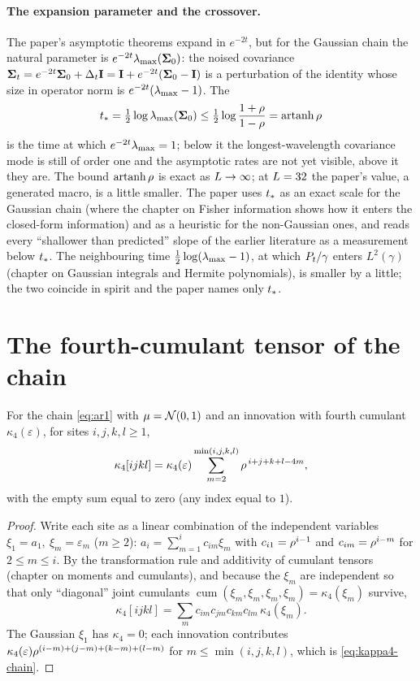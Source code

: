 \paragraph{The expansion parameter and the crossover.}
The paper's asymptotic theorems expand in $e^{-2t}$, but for the Gaussian chain the
natural parameter is $e^{-2t}\lambda_{\max}(\mathbf{\Sigma}_0)$: the noised covariance
$\mathbf{\Sigma}_t=e^{-2t}\mathbf{\Sigma}_0+\Delta_t\mathbf{I}=\mathbf{I}+e^{-2t}(\mathbf{\Sigma}_0-\mathbf{I})$ is a perturbation of the identity
whose size in operator norm is $e^{-2t}(\lambda_{\max}-1)$. The 
\begin{equation}
  t_{*}=\tfrac12\log\lambda_{\max}(\mathbf{\Sigma}_0)\le\tfrac12\log\frac{1+\rho}{1-\rho}=\operatorname{artanh}\rho
  \label{eq:tstar}
\end{equation}
is the time at which $e^{-2t}\lambda_{\max}=1$; below it the longest-wavelength covariance mode
is still of order one and the asymptotic rates are not yet visible, above it they
are. The bound $\operatorname{artanh}\rho$ is exact as $L\to\infty$; at $L=32$
the paper's value, a generated macro, is a little smaller. The paper uses
$t_{*}$ as an exact scale for the Gaussian chain (where the chapter on Fisher
information shows how it enters the closed-form information) and as a heuristic for
the non-Gaussian ones, and reads every ``shallower than predicted'' slope of the
earlier literature as a measurement below $t_{*}$. The neighbouring time
$\tfrac12\log(\lambda_{\max}-1)$, at which $P_t/\gamma$ enters $L^2(\gamma)$ (chapter on
Gaussian integrals and Hermite polynomials), is smaller by a little; the two coincide
in spirit and the paper names only $t_{*}$.

\section{The fourth-cumulant tensor of the chain}
\label{sec:kappa4-chain}

\begin{proposition}
\label{prop:kappa4-chain}
For the chain \cref{eq:ar1} with $\mu=\mathcal{N}\!\left(0,1\right)$ and an innovation with fourth cumulant
$\kappa_4(\varepsilon)$, for sites $i,j,k,l\ge1$,
\begin{equation}
  \kappa_4[ijkl]=\kappa_4(\varepsilon)\sum_{m=2}^{\min(i,j,k,l)}\rho^{\,i+j+k+l-4m},
  \label{eq:kappa4-chain}
\end{equation}
with the empty sum equal to zero (any index equal to $1$).
\end{proposition}
\begin{proof}
Write each site as a linear combination of the independent variables
$\xi_1=a_1,\ \xi_m=\varepsilon_m$ ($m\ge2$): $a_i=\sum_{m=1}^ic_{im}\xi_m$ with
$c_{i1}=\rho^{i-1}$ and $c_{im}=\rho^{i-m}$ for $2\le m\le i$. By the transformation rule
and additivity of cumulant tensors (chapter on moments and cumulants), and because the
$\xi_m$ are independent so that only ``diagonal'' joint cumulants
$\operatorname{cum}(\xi_m,\xi_m,\xi_m,\xi_m)=\kappa_4(\xi_m)$ survive,
\[
  \kappa_4[ijkl]=\sum_mc_{im}c_{jm}c_{km}c_{lm}\,\kappa_4(\xi_m).
\]
The Gaussian $\xi_1$ has $\kappa_4=0$; each innovation contributes
$\kappa_4(\varepsilon)\rho^{(i-m)+(j-m)+(k-m)+(l-m)}$ for $m\le\min(i,j,k,l)$, which is
\cref{eq:kappa4-chain}.
\end{proof}

